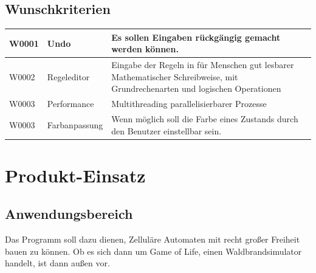 \documentclass[11pt]{article}
\begin{document}

\subsection{Wunschkriterien}
\begin{longtable}[m]{|m{2.2cm}|m{4cm}|m{8cm}|}
\hline
W0001 & Undo & Es sollen Eingaben rückgängig gemacht werden können.\\
\hline
W0002 & Regeleditor & Eingabe der Regeln in für Menschen gut lesbarer Mathematischer Schreibweise, mit Grundrechenarten und logischen Operationen\\
\hline
W0003 & Performance & Multithreading parallelisierbarer Prozesse\\
\hline
W0003 &Farbanpassung & Wenn möglich soll die Farbe eines Zustands durch den Benutzer einstellbar sein.\\
\hline
\end{longtable}


\pagebreak
\section{Produkt-Einsatz}
\subsection{Anwendungsbereich}
Das Programm soll dazu dienen, Zelluläre Automaten mit recht großer Freiheit bauen zu können. Ob es sich dann um Game of Life, einen Waldbrandsimulator handelt, ist dann außen vor.
\end{document}
